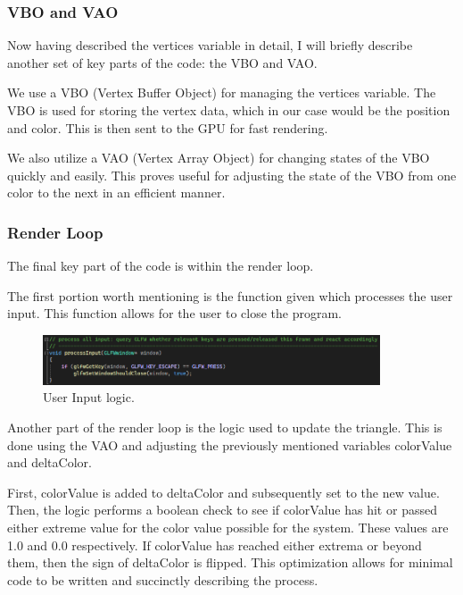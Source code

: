 \newpage

\subsubsection{VBO and VAO}

Now having described the vertices variable in detail, I will briefly describe another set of key parts of the code: the VBO and VAO.

We use a VBO (Vertex Buffer Object) for managing the vertices variable.
The VBO is used for storing the vertex data, which in our case would be the position and color.
This is then sent to the GPU for fast rendering.

We also utilize a VAO (Vertex Array Object) for changing states of the VBO quickly and easily.
This proves useful for adjusting the state of the VBO from one color to the next in an efficient manner.

\subsubsection{Render Loop}

The final key part of the code is within the render loop.

The first portion worth mentioning is the function given which processes the user input.
This function allows for the user to close the program.

\begin{figure}[htb]
    \centering
    \includegraphics[width=10cm]{./Images/Escape.png}
       \caption{User Input logic.}
           \label{Fig:Escape}
\end{figure}

Another part of the render loop is the logic used to update the triangle.
This is done using the VAO and adjusting the previously mentioned variables colorValue and deltaColor.

\newpage

First, colorValue is added to deltaColor and subsequently set to the new value.
Then, the logic performs a boolean check to see if colorValue has hit or passed either extreme value for the color value possible for the system.
These values are 1.0 and 0.0 respectively.
If colorValue has reached either extrema or beyond them, then the sign of deltaColor is flipped.
This optimization allows for minimal code to be written and succinctly describing the process.


